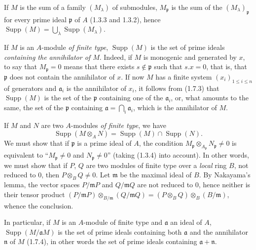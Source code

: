 \begin{env}[1.7.3]
\label{0.1.7.3}
If $M$ is the sum of a family $(M_\lambda)$ of submodules,
$M_{\mathfrak p}$ is the sum of the $(M_\lambda)_{\mathfrak p}$ for every prime
ideal $\mathfrak p$ of $A$ (1.3.3 and 1.3.2), hence $\operatorname{Supp}(M)=\bigcup_\lambda\operatorname{Supp}(M_\lambda)$.
\end{env}

\begin{env}[1.7.4]
\label{0.1.7.4}
If $M$ is an $A$-module \emph{of finite type}, $\operatorname{Supp}(M)$ is
the set of prime ideals \emph{containing the annihilator of $M$}. Indeed,
if $M$ is monogenic and generated by $x$, to say that $M_{\mathfrak p}=0$ means
that there exists $s\notin\mathfrak p$ such that $s.x=0$, that is, that $\mathfrak p$ does not
contain the annihilator of $x$. If now $M$ has a finite system
$(x_i)_{1\leq i\leq n}$ of generators and $\mathfrak a_i$ is the annihilator
of $x_i$, it follows from (1.7.3) that $\operatorname{Supp}(M)$ is the set of
the $\mathfrak p$ containing one of the $\mathfrak a_i$, or, what amounts to the same,
the set of the $\mathfrak p$ containing $\mathfrak a=\bigcap_i\mathfrak a_i$,
which is the annihilator of $M$.
\end{env}

\begin{env}[1.7.5]
\label{0.1.7.5}
If $M$ and $N$ are two $A$-modules \emph{of finite type}, we have
\[
  \operatorname{Supp}(M\otimes_A N)
  =\operatorname{Supp}(M)\cap\operatorname{Supp}(N).
\]
We must show that if $\mathfrak p$ is a prime ideal of $A$, the
condition $M_{\mathfrak p}\otimes_{A_{\mathfrak p}}N_{\mathfrak p}\neq0$ is
equivalent to ``$M_{\mathfrak p}\neq0$ and $N_{\mathfrak p}\neq0$'' (taking
(1.3.4) into account). In other words, we must show that if $P$, $Q$ are two
modules of finite type over a \emph{local} ring $B$, not reduced to $0$, then
$P\otimes_B Q\neq0$. Let $\mathfrak m$ be the maximal ideal of $B$. By
Nakayama's lemma, the vector spaces $P/\mathfrak mP$ and
$Q/\mathfrak mQ$ are not reduced to $0$, hence neither is their
tensor product $(P/\mathfrak mP)\otimes_{B/\mathfrak m}(Q/\mathfrak mQ)=(P\otimes_B Q)\otimes_B(B/\mathfrak m)$,
whence the conclusion.

In particular, if $M$ is an $A$-module of finite type and $\mathfrak a$ an ideal
of $A$, $\operatorname{Supp}(M/\mathfrak aM)$ is the set of prime
ideals containing both $\mathfrak a$ and the annihilator $\mathfrak n$ of
$M$ (1.7.4), in other words the set of prime ideals containing
$\mathfrak a+\mathfrak n$.
\end{env}


